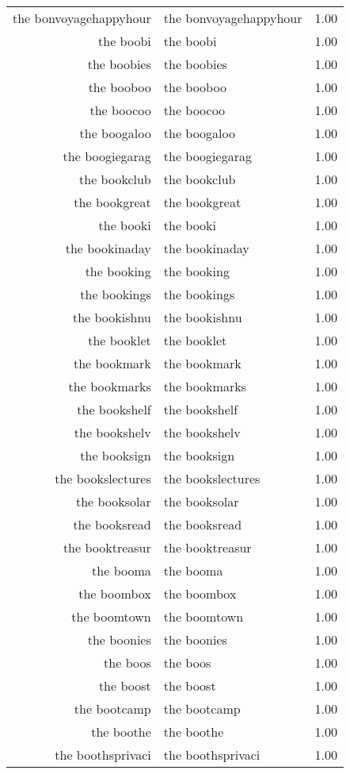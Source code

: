 \begin{table}[ht]
\begin{tabular}{rlr}
  the bonvoyagehappyhour & the bonvoyagehappyhour & 1.00 \\ 
  the boobi & the boobi & 1.00 \\ 
  the boobies & the boobies & 1.00 \\ 
  the booboo & the booboo & 1.00 \\ 
  the boocoo & the boocoo & 1.00 \\ 
  the boogaloo & the boogaloo & 1.00 \\ 
  the boogiegarag & the boogiegarag & 1.00 \\ 
  the bookclub & the bookclub & 1.00 \\ 
  the bookgreat & the bookgreat & 1.00 \\ 
  the booki & the booki & 1.00 \\ 
  the bookinaday & the bookinaday & 1.00 \\ 
  the booking & the booking & 1.00 \\ 
  the bookings & the bookings & 1.00 \\ 
  the bookishnu & the bookishnu & 1.00 \\ 
  the booklet & the booklet & 1.00 \\ 
  the bookmark & the bookmark & 1.00 \\ 
  the bookmarks & the bookmarks & 1.00 \\ 
  the bookshelf & the bookshelf & 1.00 \\ 
  the bookshelv & the bookshelv & 1.00 \\ 
  the booksign & the booksign & 1.00 \\ 
  the bookslectures & the bookslectures & 1.00 \\ 
  the booksolar & the booksolar & 1.00 \\ 
  the booksread & the booksread & 1.00 \\ 
  the booktreasur & the booktreasur & 1.00 \\ 
  the booma & the booma & 1.00 \\ 
  the boombox & the boombox & 1.00 \\ 
  the boomtown & the boomtown & 1.00 \\ 
  the boonies & the boonies & 1.00 \\ 
  the boos & the boos & 1.00 \\ 
  the boost & the boost & 1.00 \\ 
  the bootcamp & the bootcamp & 1.00 \\ 
  the boothe & the boothe & 1.00 \\ 
  the boothsprivaci & the boothsprivaci & 1.00 \\ 

\end{tabular}
\end{table}
